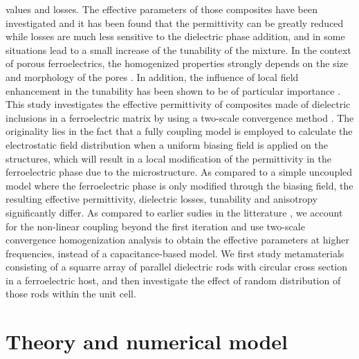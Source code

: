 \documentclass[aps,prb,11pt]{revtex4-1}
\begin{document}
\noindent values and losses.
The effective parameters of those composites have been investigated \cite{sherman_ferroelectric-dielectric_2006, jylha_tunability_2008, sherman_tunability_2004, astafiev_can_2003} and it has been found that the
permittivity can be greatly reduced while losses are much less sensitive to the dielectric phase addition, and in some situations lead to a small increase of the tunability of the mixture. In the context of porous ferroelectrics, the homogenized properties strongly depends on the size and morphology of the pores \cite{okazaki_effects_1973,stanculescu_study_2015}. In addition, the influence
of local field enhancement in the tunability has been shown to be of particular importance \cite{padurariu_tailoring_2012,padurariu_field-dependent_2012,cazacu_tunable_2013}.
\\
This study investigates the effective permittivity of composites made of dielectric inclusions in a ferroelectric matrix
by using a two-scale convergence method \cite{allaire_homogenization_1992, guenneau_homogenization_2000}.
The originality lies in the fact that a fully coupling model is employed to
calculate the electrostatic field distribution when a uniform biasing field is
applied on the structures, which will result in a local modification of the permittivity
in the ferroelectric phase due to the microstructure. As compared to a simple uncoupled model where the
ferroelectric phase is only modified through the biasing field,
the resulting effective permittivity, dielectric losses, tunability and
anisotropy significantly differ. As compared to earlier sudies in the litterature \cite{padurariu_tailoring_2012,padurariu_field-dependent_2012}, we account for
the non-linear coupling beyond the first iteration and use two-scale
convergence homogenization analysis to obtain the effective parameters at higher frequencies, instead of a capacitance-based model.
We first study metamaterials consisting of a squarre array of parallel dielectric rods with circular cross section in a ferroelectric host, and then investigate the effect of random distribution of those rods within the unit cell.



\section{Theory and numerical model}
\end{document}

